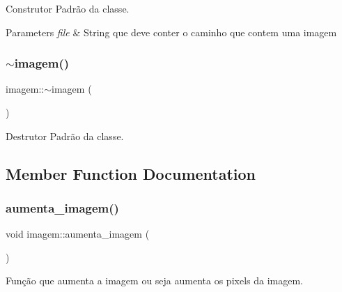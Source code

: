 Construtor Padrão da classe. 


\begin{DoxyParams}{Parameters}
{\em file} & String que deve conter o caminho que contem uma imagem \\
\hline
\end{DoxyParams}
\mbox{\label{classimagem_adefef7f11bc59fe5ab28ce3d19fb1823}} 
\subsubsection{\texorpdfstring{$\sim$imagem()}{~imagem()}}
{\footnotesize\ttfamily imagem\+::$\sim$imagem (\begin{DoxyParamCaption}{ }\end{DoxyParamCaption})\hspace{0.3cm}{\ttfamily [inline]}}



Destrutor Padrão da classe. 



\subsection{Member Function Documentation}
\mbox{\label{classimagem_aea8dbfce37d53ab5482831ae9feb9997}} 
\subsubsection{\texorpdfstring{aumenta\+\_\+imagem()}{aumenta\_imagem()}}
{\footnotesize\ttfamily void imagem\+::aumenta\+\_\+imagem (\begin{DoxyParamCaption}{ }\end{DoxyParamCaption})}



Função que aumenta a imagem ou seja aumenta os pixels da imagem. 

\mbox{\label{classimagem_adf6ca234d55595b5518e189afd24349c}} 
